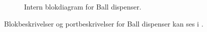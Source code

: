 \documentclass[Rapport/Rapport_main.tex]{subfiles}
\begin{document}
\begin{figure}[H]
    \centering
    \caption{Intern blokdiagram for Ball dispenser.}
    \label{fig:rap_balldispensere_hardware_ibd}
\end{figure}

Blokbeskrivelser og portbeskrivelser for Ball dispenser kan ses i .
\end{document}
